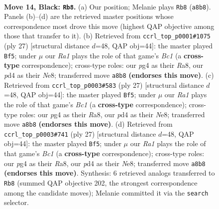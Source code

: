 \documentclass[11pt]{article}
\begin{document}
\clearpage

\begin{figure}[p]\centering
\begin{subfigure}{0.46\textwidth}\centering
\resizebox{\linewidth}{!}{%
\newchessgame
\chessboard[
  setfen={r1b2qk1/p1pp1ppp/3n1b2/1p6/3P2P1/NP6/P1P2P1P/R1BQ1BK1 b - - 2 14},
  showmover=false,
  pgfstyle=straightmove, color=movearrow, markmove={a8-b8}
]}
\caption{}
\end{subfigure}\hfill
\begin{subfigure}{0.46\textwidth}\centering
\resizebox{\linewidth}{!}{%
\newchessgame
\chessboard[
  setfen={r1bqn1k1/ppp2ppp/5b2/3p4/3P1B2/2P5/PP1N1PPP/R3QBK1 b - - 1 14},
  showmover=false,
  pgfstyle=straightmove, color=movearrow, markmove={c8-f5}
]}
\caption{}
\end{subfigure}
\\[4pt]
\begin{subfigure}{0.46\textwidth}\centering
\resizebox{\linewidth}{!}{%
\newchessgame
\chessboard[
  setfen={r1bqn1k1/ppp2ppp/5b2/3p4/3P1B2/2P5/PP1N1PPP/R3QBK1 b - - 1 14},
  showmover=false,
  pgfstyle=straightmove, color=movearrow, markmove={c8-f5}
]}
\caption{}
\end{subfigure}\hfill
\begin{subfigure}{0.46\textwidth}\centering
\resizebox{\linewidth}{!}{%
\newchessgame
\chessboard[
  setfen={r1bqn1k1/ppp2ppp/5b2/3p4/3P1B2/2P5/PP1N1PPP/R3QBK1 b - - 1 14},
  showmover=false,
  pgfstyle=straightmove, color=movearrow, markmove={c8-f5}
]}
\caption{}
\end{subfigure}
\caption{\textbf{Move 14, Black: \texttt{Rb8}.} (a) Our position; Melanie plays \texttt{Rb8} (\texttt{a8b8}). Panels (b)--(d) are the retrieved master positions whose correspondence most drove this move (highest QAP objective among those that transfer to it). (b) Retrieved from \texttt{ccrl\_top\_p0001\#1075} (ply 27) [structural distance $d$=48, QAP obj=44]: the master played \texttt{Bf5}; under $\mu$ our \emph{Ra1} plays the role of that game's \emph{Bc1} (a \textbf{cross-type} correspondence); cross-type roles: our \emph{p}g4 as their \emph{R}a8, our \emph{p}d4 as their \emph{N}e8; transferred move \texttt{a8b8} \textbf{(endorses this move)}. (c) Retrieved from \texttt{ccrl\_top\_p0003\#583} (ply 27) [structural distance $d$=48, QAP obj=44]: the master played \texttt{Bf5}; under $\mu$ our \emph{Ra1} plays the role of that game's \emph{Bc1} (a \textbf{cross-type} correspondence); cross-type roles: our \emph{p}g4 as their \emph{R}a8, our \emph{p}d4 as their \emph{N}e8; transferred move \texttt{a8b8} \textbf{(endorses this move)}. (d) Retrieved from \texttt{ccrl\_top\_p0003\#741} (ply 27) [structural distance $d$=48, QAP obj=44]: the master played \texttt{Bf5}; under $\mu$ our \emph{Ra1} plays the role of that game's \emph{Bc1} (a \textbf{cross-type} correspondence); cross-type roles: our \emph{p}g4 as their \emph{R}a8, our \emph{p}d4 as their \emph{N}e8; transferred move \texttt{a8b8} \textbf{(endorses this move)}. Synthesis: 6 retrieved analogs transferred to \texttt{Rb8} (summed QAP objective 202, the strongest correspondence among the candidate moves); Melanie committed it via the \texttt{search} selector.}
\label{fig:thought-m27}
\end{figure}
\end{document}
